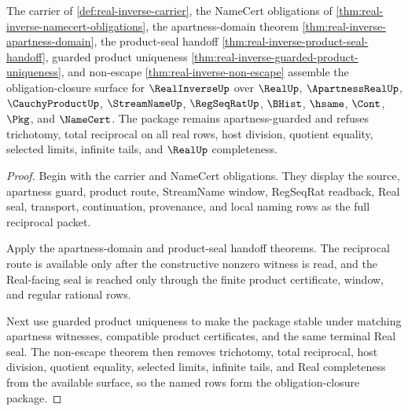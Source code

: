 \begin{theorem}
\label{thm:real-inverse-obligation-closure-package}
The carrier of \autoref{def:real-inverse-carrier}, the NameCert obligations of \autoref{thm:real-inverse-namecert-obligations}, the apartness-domain theorem \autoref{thm:real-inverse-apartness-domain}, the product-seal handoff \autoref{thm:real-inverse-product-seal-handoff}, guarded product uniqueness \autoref{thm:real-inverse-guarded-product-uniqueness}, and non-escape \autoref{thm:real-inverse-non-escape} assemble the obligation-closure surface for $\RealInverseUp$ over $\RealUp$, $\ApartnessRealUp$, $\CauchyProductUp$, $\StreamNameUp$, $\RegSeqRatUp$, $\BHist$, $\hsame$, $\Cont$, $\Pkg$, and $\NameCert$. The package remains apartness-guarded and refuses trichotomy, total reciprocal on all real rows, host division, quotient equality, selected limits, infinite tails, and $\RealUp$ completeness.
\end{theorem}
\begin{proof}
Begin with the carrier and NameCert obligations. They display the source, apartness guard, product route, StreamName window, RegSeqRat readback, Real seal, transport, continuation, provenance, and local naming rows as the full reciprocal packet.

Apply the apartness-domain and product-seal handoff theorems. The reciprocal route is available only after the constructive nonzero witness is read, and the Real-facing seal is reached only through the finite product certificate, window, and regular rational rows.

Next use guarded product uniqueness to make the package stable under matching apartness witnesses, compatible product certificates, and the same terminal Real seal. The non-escape theorem then removes trichotomy, total reciprocal, host division, quotient equality, selected limits, infinite tails, and Real completeness from the available surface, so the named rows form the obligation-closure package.
\end{proof}

